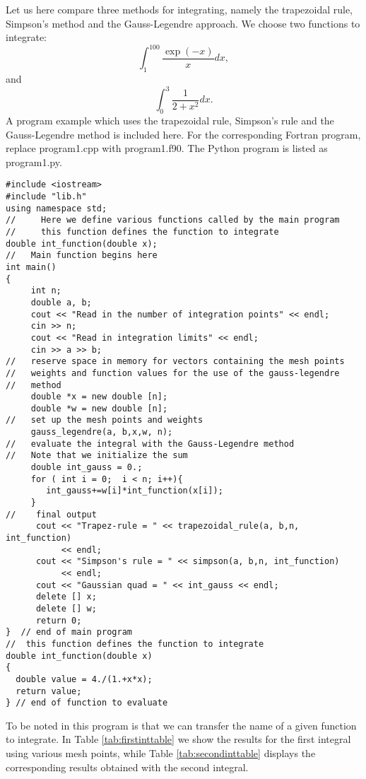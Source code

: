 Let us here compare three methods for integrating, namely the trapezoidal rule,
Simpson's method and the Gauss-Legendre approach. 
We choose two functions to integrate:
\[
  \int_1^{100}\frac{\exp{(-x)}}{x}dx,
\]
and 
\[
  \int_{0}^{3}\frac{1}{2+x^2}dx.
\] 
A program example which uses the trapezoidal rule, Simpson's rule
and the Gauss-Legendre method is included here. For the corresponding Fortran program, replace program1.cpp
with program1.f90. The Python program is listed as program1.py.
\lstset{language=c++}
\begin{lstlisting}[title={\url{http://folk.uio.no/mhjensen/compphys/programs/chapter05/cpp/program1.cpp}}]
#include <iostream>
#include "lib.h"
using namespace std;
//     Here we define various functions called by the main program
//     this function defines the function to integrate
double int_function(double x);
//   Main function begins here
int main()
{
     int n;
     double a, b;
     cout << "Read in the number of integration points" << endl;
     cin >> n;
     cout << "Read in integration limits" << endl;
     cin >> a >> b;
//   reserve space in memory for vectors containing the mesh points
//   weights and function values for the use of the gauss-legendre
//   method
     double *x = new double [n];
     double *w = new double [n];
//   set up the mesh points and weights
     gauss_legendre(a, b,x,w, n);
//   evaluate the integral with the Gauss-Legendre method
//   Note that we initialize the sum
     double int_gauss = 0.;
     for ( int i = 0;  i < n; i++){
        int_gauss+=w[i]*int_function(x[i]);
     }
//    final output
      cout << "Trapez-rule = " << trapezoidal_rule(a, b,n, int_function)
           << endl;
      cout << "Simpson's rule = " << simpson(a, b,n, int_function) 
           << endl;
      cout << "Gaussian quad = " << int_gauss << endl;
      delete [] x;
      delete [] w;
      return 0;
}  // end of main program
//  this function defines the function to integrate
double int_function(double x)
{
  double value = 4./(1.+x*x);
  return value;
} // end of function to evaluate
\end{lstlisting}
To be noted in this program is that we can transfer the name of a given function to integrate.
In Table \ref{tab:firstinttable} we show the results for the first integral using various 
mesh points, while Table \ref{tab:secondinttable} displays the corresponding results obtained
with the second integral.
